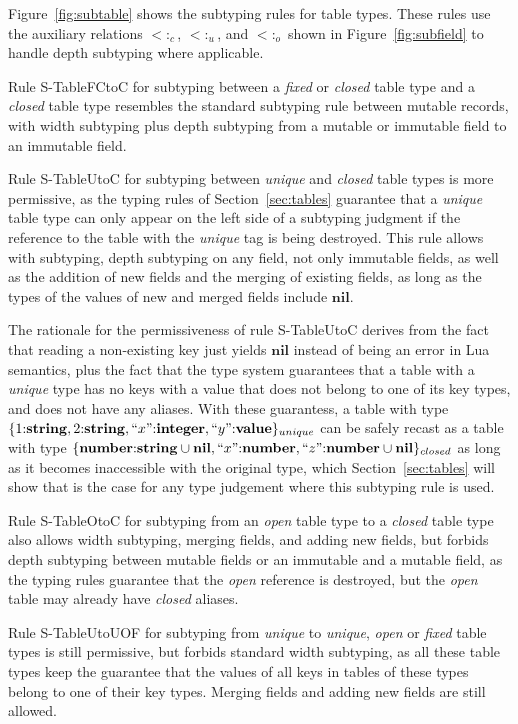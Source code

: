 \documentclass[preprint]{sigplanconf}
\newcommand{\Value}{\mathbf{value}}
\newcommand{\Nil}{\mathbf{nil}}
\newcommand{\Integer}{\mathbf{integer}}
\newcommand{\Number}{\mathbf{number}}
\newcommand{\String}{\mathbf{string}}
\newcommand{\subtype}{<:}
\begin{document}
Figure~\ref{fig:subtable} shows the subtyping rules for
table types. These rules use the auxiliary relations
$\subtype_{c}$, $\subtype_{u}$, and $\subtype_{o}$
shown in Figure~\ref{fig:subfield} to handle depth
subtyping where applicable.

Rule {\sc S-TableFCtoC} for subtyping
between a {\em fixed} or {\em closed}
table type and a {\em closed} table type resembles the
standard subtyping rule between mutable records, with
width subtyping plus depth subtyping from a mutable
or immutable field to an immutable field.

Rule {\sc S-TableUtoC} for subtyping between {\em unique} and {\em closed} table types is more permissive, as the typing rules of Section~\ref{sec:tables} guarantee that a {\em unique}
table type can only appear on the left side of a subtyping
judgment if the reference to the table with the {\em unique}
tag is being destroyed. This rule allows with subtyping, depth subtyping on any field, not only immutable fields, as well as the addition of new fields and the merging of existing fields, as long as the types of the values of new and merged fields include $\Nil$. 

The rationale for the permissiveness of rule {\sc S-TableUtoC} derives from the fact that reading a non-existing key just yields $\Nil$ instead of being an error in Lua semantics, plus the fact
that the type system guarantees that a table with a
{\em unique} type has no keys with a value that does not
belong to one of its key types, and does not have any
aliases. With these guarantess, a table with type $\{1{:}\String, 2{:}\String,
``x"{:}\Integer, ``y"{:}\Value\}_{unique}$ can be safely recast as a table with type 
$\{\Number{:}\String \cup \Nil, ``x"{:}\Number, ``z"{:}
\Number \cup \Nil\}_{closed}$ as long as it becomes
inaccessible with the original type, which Section~\ref{sec:tables} will show that is the case
for any type judgement where this subtyping rule is used.

Rule {\sc S-TableOtoC} for subtyping from an {\em open} table type to a {\em closed} table type also allows width subtyping, merging fields, and adding new fields, but forbids depth subtyping between mutable fields or an immutable and a mutable field, as the typing rules guarantee that the {\em open} reference
is destroyed, but the {\em open} table may already have {\em closed} aliases.

Rule {\sc S-TableUtoUOF} for subtyping from {\em unique} to {\em unique}, {\em open} or {\em fixed} table types is still permissive, but forbids standard width subtyping, as all these table types keep the guarantee that the values of all keys in tables of these types belong to one of their key types. Merging fields and adding new fields are still allowed.
\end{document}
